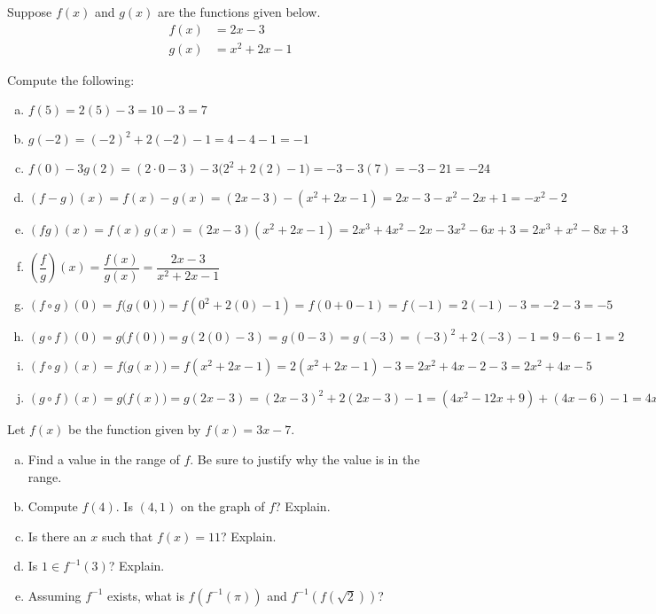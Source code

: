 \documentclass[11pt,letterpaper]{article}
\begin{document}
 Suppose $f(x)$ and $g(x)$ are the functions given below. 
	\[
	\begin{aligned}
	f(x)&= 2x - 3 \\[0.3cm]
	g(x)&= x^2 + 2x - 1
	\end{aligned}
	\]

Compute the following: \pspace
        \begin{enumerate}[(a)]
        \item $f(5)= 2(5) - 3= 10 - 3= 7$ \vfill
        \item $g(-2)= (-2)^2 + 2(-2) - 1= 4 - 4 - 1= -1 $ \vfill
        \item $f(0) - 3g(2)= (2 \cdot 0 - 3) - 3 \big( 2^2 + 2(2) - 1 \big)= -3 - 3(7)= -3 - 21= -24$ \vfill
        \item $(f - g)(x)= f(x) - g(x)= (2x - 3) - (x^2 + 2x - 1)= 2x - 3 - x^2 - 2x + 1= -x^2 - 2$ \vfill
        \item $(fg)(x)= f(x) \, g(x)= (2x - 3)(x^2 + 2x - 1)= 2x^3 + 4x^2 - 2x - 3x^2 - 6x + 3= 2x^3 + x^2 - 8x + 3$ \vfill
        \item $\left( \dfrac{f}{g} \right)(x)= \dfrac{f(x)}{g(x)}= \dfrac{2x - 3}{x^2 + 2x - 1}$ \vfill
        \item $(f \circ g)(0)= f\big( g(0) \big)= f(0^2 + 2(0) - 1)= f(0 + 0 - 1)= f(-1)= 2(-1) - 3= -2 - 3= -5$ \vfill
        \item $(g \circ f)(0)= g\big( f(0) \big)= g( 2(0) - 3)= g(0 - 3)= g(-3)= (-3)^2 + 2(-3) - 1= 9 - 6 - 1= 2$ \vfill
        \item $(f \circ g)(x)= f\big( g(x) \big)= f(x^2 + 2x - 1)= 2(x^2 + 2x - 1) - 3= 2x^2 + 4x - 2 - 3= 2x^2 + 4x - 5$ \vfill
        \item $(g \circ f)(x)= g\big( f(x) \big)= g(2x - 3)= (2x - 3)^2 + 2(2x - 3) - 1= (4x^2 - 12x + 9) + (4x - 6) - 1= 4x^2 - 8x + 2$ \vfill
        \end{enumerate} 



\newpage



 Let $f(x)$ be the function given by $f(x)= 3x - 7$. 
	\begin{enumerate}[(a)]
	\item Find a value in the range of $f$. Be sure to justify why the value is in the range. 
	\item Compute $f(4)$. Is $(4, 1)$ on the graph of $f$? Explain. 
	\item Is there an $x$ such that $f(x)= 11$? Explain. 
	\item Is $1 \in f^{-1}(3)$? Explain. 
	\item Assuming $f^{-1}$ exists, what is $f(f^{-1}(\pi))$ and $f^{-1}(f(\sqrt{2}))$?
	\end{enumerate} \pspace
\end{document}
